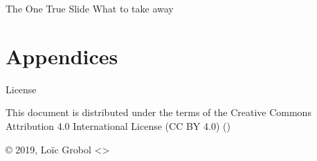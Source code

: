 \documentclass[
	hyperref={unicode},
	xcolor={svgnames},
	aspectratio=169,
	french,
]{beamer}
\title{\titlepagetitle}
\author{\myname~(\mylab)}
\institute{}
\date{\eventname\\\eventvenue, \eventdate}
\begin{document}

\begin{frame}[plain]
	\titlepage
\end{frame}


\begin{frame}{The One True Slide}
	What to take away
\end{frame}


\hypersetup{bookmarksdepth=0}  %
\appendix
\hypersetup{bookmarksdepth=2}
\section{Appendices}


\begin{frame}{License}
	\begin{center}
		{\huge \ccby}
		\vfill
		This document is distributed under the terms of the Creative Commons Attribution 4.0 International License (CC BY 4.0) ()

		\vfill
		© 2019, Loïc Grobol <>

	\end{center}
\end{frame}
\end{document}
